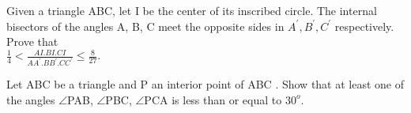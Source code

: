 \item Given a triangle ABC, let I be the center of its inscribed circle. The internal bisectors of the angles A, B, C meet the opposite sides in $A^{'}, B^{'}, C^{'}$ respectively. Prove that\\
 $\frac{1}{4} < \frac{AI . BI . CI}{AA^{'}. BB^{'} . CC^{'}} \leq \frac{8}{27}.$

\item Let ABC be a triangle and P an interior point of ABC . Show that at least one of the angles $\angle$PAB, $\angle$PBC, $\angle$PCA is less than or equal to $30^{o}.$


